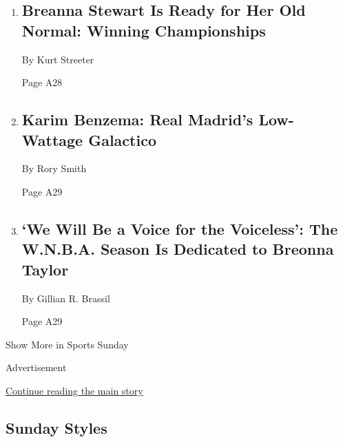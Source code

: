 \begin{enumerate}
\def\labelenumi{\arabic{enumi}.}
\item
  \href{/2020/07/25/sports/basketball/breanna-stewart-seattle-storm-wnba.html}{}

  \hypertarget{breanna-stewart-is-ready-for-her-old-normal-winning-championships}{%
  \subsection{Breanna Stewart Is Ready for Her Old Normal: Winning
  Championships}\label{breanna-stewart-is-ready-for-her-old-normal-winning-championships}}

  By Kurt Streeter

  Page A28
\item
  \href{/2020/07/24/sports/soccer/karim-benzema-real-madrid.html}{}

  \hypertarget{karim-benzema-real-madrids-low-wattage-galactico}{%
  \subsection{Karim Benzema: Real Madrid's Low-Wattage
  Galactico}\label{karim-benzema-real-madrids-low-wattage-galactico}}

  By Rory Smith

  Page A29
\item
  \href{/2020/07/25/sports/wnba-seattle-storm-new-york-liberty.html}{}

  \hypertarget{we-will-be-a-voice-for-the-voiceless-the-wnba-season-is-dedicated-to-breonna-taylor}{%
  \subsection{`We Will Be a Voice for the Voiceless': The W.N.B.A.
  Season Is Dedicated to Breonna
  Taylor}\label{we-will-be-a-voice-for-the-voiceless-the-wnba-season-is-dedicated-to-breonna-taylor}}

  By Gillian R. Brassil

  Page A29
\end{enumerate}

Show More in Sports Sunday

Advertisement

\protect\hyperlink{after-mid7}{Continue reading the main story}

\hypertarget{sunday-styles}{%
\subsection{Sunday Styles}\label{sunday-styles}}

